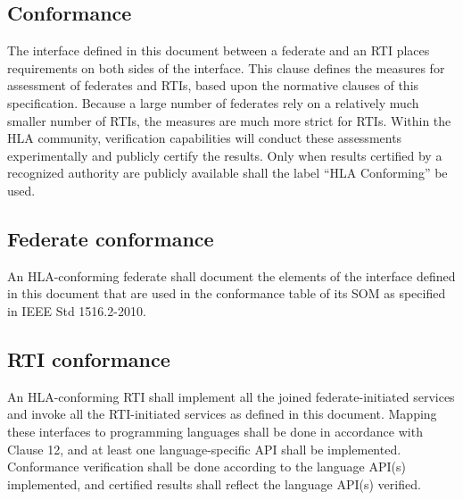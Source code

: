 
\clearpage

\begin{compactstdpage}
    \section{Conformance}

    The interface defined in this document between a federate and an RTI places requirements on both sides of the interface. This clause defines the measures for assessment of federates and RTIs, based upon the normative clauses of this specification. Because a large number of federates rely on a relatively much smaller number of RTIs, the measures are much more strict for RTIs. Within the HLA community, verification capabilities will conduct these assessments experimentally and publicly certify the results. Only when results certified by a recognized authority are publicly available shall the label ``HLA Conforming'' be used.

    \subsection{Federate conformance}

    An HLA-conforming federate shall document the elements of the interface defined in this document that are used in the conformance table of its SOM as specified in IEEE Std 1516.2-2010.

    \subsection{RTI conformance}

    An HLA-conforming RTI shall implement all the joined federate-initiated services and invoke all the RTI-initiated services as defined in this document. Mapping these interfaces to programming languages shall be done in accordance with Clause 12, and at least one language-specific API shall be implemented. Conformance verification shall be done according to the language API(s) implemented, and certified results shall reflect the language API(s) verified.
\end{compactstdpage}

\clearpage

\thispagestyle{body}
\null
